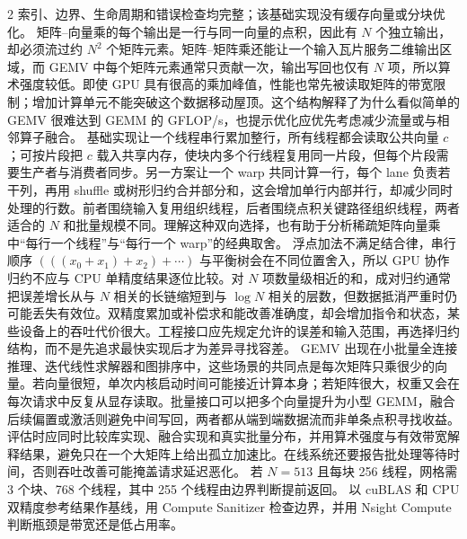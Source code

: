 \begin{solutionexercise}{2}
\conclusionheading 索引、边界、生命周期和错误检查均完整；该基础实现没有缓存向量或分块优化。
\discussionheading
{}
矩阵--向量乘的每个输出是一行与同一向量的点积，因此有 $N$ 个独立输出，却必须流过约 $N^2$ 个矩阵元素。矩阵--矩阵乘还能让一个输入瓦片服务二维输出区域，而 GEMV 中每个矩阵元素通常只贡献一次，输出写回也仅有 $N$ 项，所以算术强度较低。即使 GPU 具有很高的乘加峰值，性能也常先被读取矩阵的带宽限制；增加计算单元不能突破这个数据移动屋顶。这个结构解释了为什么看似简单的 GEMV 很难达到 GEMM 的 GFLOP/s，也提示优化应优先考虑减少流量或与相邻算子融合。
基础实现让一个线程串行累加整行，所有线程都会读取公共向量 $c$；可按片段把 $c$ 载入共享内存，使块内多个行线程复用同一片段，但每个片段需要生产者与消费者同步。另一方案让一个 warp 共同计算一行，每个 lane 负责若干列，再用 shuffle 或树形归约合并部分和，这会增加单行内部并行，却减少同时处理的行数。前者围绕输入复用组织线程，后者围绕点积关键路径组织线程，两者适合的 $N$ 和批量规模不同。理解这种双向选择，也有助于分析稀疏矩阵向量乘中“每行一个线程”与“每行一个 warp”的经典取舍。
浮点加法不满足结合律，串行顺序 $(((x_0+x_1)+x_2)+\cdots)$ 与平衡树会在不同位置舍入，所以 GPU 协作归约不应与 CPU 单精度结果逐位比较。对 $N$ 项数量级相近的和，成对归约通常把误差增长从与 $N$ 相关的长链缩短到与 $\log N$ 相关的层数，但数据抵消严重时仍可能丢失有效位。双精度累加或补偿求和能改善准确度，却会增加指令和状态，某些设备上的吞吐代价很大。工程接口应先规定允许的误差和输入范围，再选择归约结构，而不是先追求最快实现后才为差异寻找容差。
GEMV 出现在小批量全连接推理、迭代线性求解器和图排序中，这些场景的共同点是每次矩阵只乘很少的向量。若向量很短，单次内核启动时间可能接近计算本身；若矩阵很大，权重又会在每次请求中反复从显存读取。批量接口可以把多个向量提升为小型 GEMM，融合后续偏置或激活则避免中间写回，两者都从端到端数据流而非单条点积寻找收益。评估时应同时比较库实现、融合实现和真实批量分布，并用算术强度与有效带宽解释结果，避免只在一个大矩阵上给出孤立加速比。在线系统还要报告批处理等待时间，否则吞吐改善可能掩盖请求延迟恶化。
\variantheading 若 $N=513$ 且每块 256 线程，网格需 3 个块、768 个线程，其中 255 个线程由边界判断提前返回。
\practiceheading 以 cuBLAS  和 CPU 双精度参考结果作基线，用 Compute Sanitizer 检查边界，并用 Nsight Compute 判断瓶颈是带宽还是低占用率。
\end{solutionexercise}

